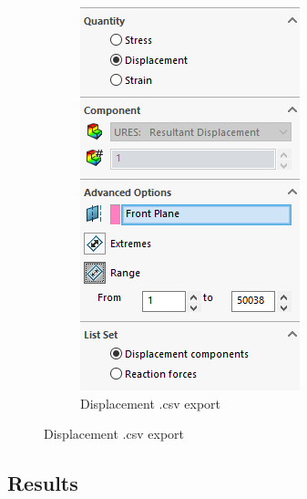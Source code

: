 \documentclass[12pt, letterpaper]{article}
\begin{document}
\begin{figure}[H]
\begin{subfigure}[b]{.3\linewidth}
	\end{subfigure}
	\begin{subfigure}[b]{.3\linewidth}
		\caption{Displacement .csv export}
		\includegraphics[width=\linewidth]{./procedure/displacement-list}
	\end{subfigure}
\end{figure}

\subsection{Results}
\label{sec:results}
\end{document}
